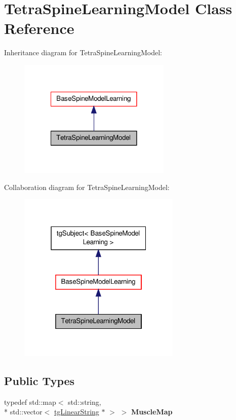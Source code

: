 \hypertarget{class_tetra_spine_learning_model}{\section{Tetra\-Spine\-Learning\-Model Class Reference}
\label{class_tetra_spine_learning_model}
}


Inheritance diagram for Tetra\-Spine\-Learning\-Model\-:\nopagebreak
\begin{figure}[H]
\begin{center}
\leavevmode
\includegraphics[width=206pt]{class_tetra_spine_learning_model__inherit__graph}
\end{center}
\end{figure}


Collaboration diagram for Tetra\-Spine\-Learning\-Model\-:\nopagebreak
\begin{figure}[H]
\begin{center}
\leavevmode
\includegraphics[width=220pt]{class_tetra_spine_learning_model__coll__graph}
\end{center}
\end{figure}
\subsection*{Public Types}
\begin{DoxyCompactItemize}
\item 
\hypertarget{class_base_spine_model_learning_a0f779ad979f0353d68af012f50f822b7}{typedef std\-::map$<$ std\-::string, \\*
std\-::vector$<$ \hyperlink{classtg_linear_string}{tg\-Linear\-String} $\ast$ $>$ $>$ {\bfseries Muscle\-Map}}\label{class_base_spine_model_learning_a0f779ad979f0353d68af012f50f822b7}

\end{DoxyCompactItemize}
